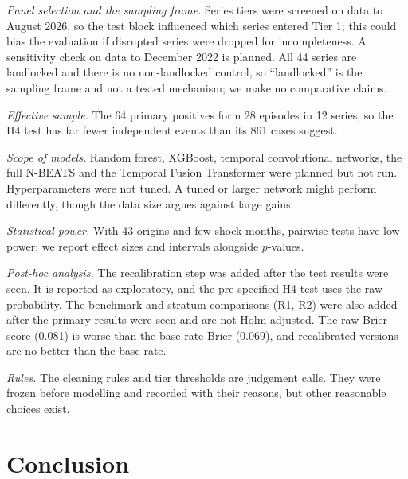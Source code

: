 \documentclass[conference]{IEEEtran}
\begin{document}
\textit{Panel selection and the sampling frame.} Series tiers were screened on data to August 2026, so the test block influenced which series entered Tier 1; this could bias the evaluation if disrupted series were dropped for incompleteness. A sensitivity check on data to December 2022 is planned. All 44 series are landlocked and there is no non-landlocked control, so ``landlocked'' is the sampling frame and not a tested mechanism; we make no comparative claims.

\textit{Effective sample.} The 64 primary positives form 28 episodes in 12 series, so the H4 test has far fewer independent events than its 861 cases suggest.

\textit{Scope of models.} Random forest, XGBoost, temporal convolutional networks, the full N-BEATS and the Temporal Fusion Transformer were planned but not run. Hyperparameters were not tuned. A tuned or larger network might perform differently, though the data size argues against large gains.

\textit{Statistical power.} With 43 origins and few shock months, pairwise tests have low power; we report effect sizes and intervals alongside $p$-values.

\textit{Post-hoc analysis.} The recalibration step was added after the test results were seen. It is reported as exploratory, and the pre-specified H4 test uses the raw probability. The benchmark and stratum comparisons (R1, R2) were also added after the primary results were seen and are not Holm-adjusted. The raw Brier score (0.081) is worse than the base-rate Brier (0.069), and recalibrated versions are no better than the base rate.

\textit{Rules.} The cleaning rules and tier thresholds are judgement calls. They were frozen before modelling and recorded with their reasons, but other reasonable choices exist.

\section{Conclusion}\label{sec:conclusion}
\end{document}
